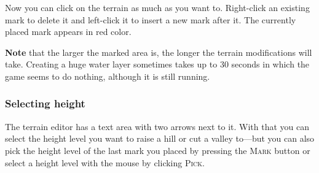 \documentclass[a4paper]{article}
\newcommand{\ccaption}[1]{\textsc{#1}}
\newcommand{\note}[1]{\textbf{Note} #1 \par}
\begin{document}
Now you can click on the terrain as much as you want to. Right-click an existing mark to delete it and left-click it to insert a new mark
after it. The currently placed mark appears in red color.

\note{that the larger the marked area is, the longer the terrain modifications will take. Creating a huge water layer sometimes takes up to
30 seconds in which the game seems to do nothing, although it is still running.}

\subsubsection{Selecting height}
The terrain editor has a text area with two arrows next to it. With that you can select the height level you want to raise a hill or cut
a valley to---but you can also pick the height level of the last mark you placed by pressing the \ccaption{Mark} button or select a height
level with the mouse by clicking \ccaption{Pick}.
\end{document}
